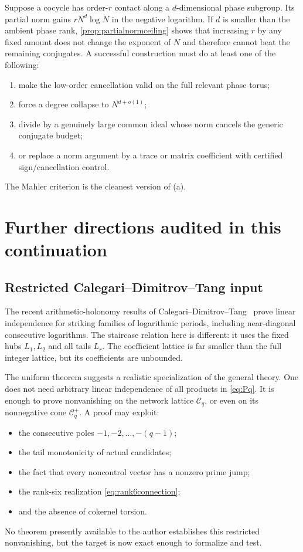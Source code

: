 \documentclass[11pt]{article}
\theoremstyle{definition}
\theoremstyle{remark}
\newcommand{\cC}{\mathcal C}
\begin{document}
Suppose a cocycle has order-$r$ contact along a $d$-dimensional phase subgroup.
Its partial norm gains $rN^d\log N$ in the negative logarithm.  If $d$ is smaller
than the ambient phase rank, \cref{prop:partialnormceiling} shows that increasing
$r$ by any fixed amount does not change the exponent of $N$ and therefore cannot
beat the remaining conjugates.  A successful construction must do at least one
of the following:
\begin{enumerate}[label=\textup{(\alph*)}]
\item make the low-order cancellation valid on the full relevant phase torus;
\item force a degree collapse to $N^{d+o(1)}$;
\item divide by a genuinely large common ideal whose norm cancels the generic
conjugate budget;
\item or replace a norm argument by a trace or matrix coefficient with certified
sign/cancellation control.
\end{enumerate}
The Mahler criterion is the cleanest version of (a).

\section{Further directions audited in this continuation}

\subsection{Restricted Calegari--Dimitrov--Tang input}

The recent arithmetic-holonomy results of Calegari--Dimitrov--Tang~\cite{CDT2024,CDTsurvey2026} prove
linear independence for striking families of logarithmic periods, including
near-diagonal consecutive logarithms.  The staircase relation here is different:
it uses the fixed hubs $L_1,L_2$ and all tails $L_r$.  The coefficient lattice is
far smaller than the full integer lattice, but its coefficients are unbounded.

The uniform theorem suggests a realistic specialization of the general theory.
One does not need arbitrary linear independence of all products in
\eqref{eq:Pq}.  It is enough to prove nonvanishing on the network lattice
$\cC_q$, or even on its nonnegative cone $\cC_q^+$.  A proof may exploit:
\begin{itemize}
\item the consecutive poles $-1,-2,\ldots,-(q-1)$;
\item the tail monotonicity of actual candidates;
\item the fact that every noncontrol vector has a nonzero prime jump;
\item the rank-six realization \eqref{eq:rank6connection};
\item and the absence of cokernel torsion.
\end{itemize}
No theorem presently available to the author establishes this restricted
nonvanishing, but the target is now exact enough to formalize and test.
\end{document}
